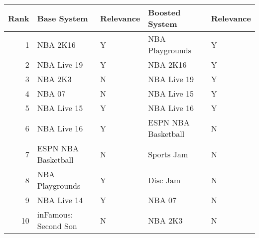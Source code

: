 \begin{tabular}{rllll}
\toprule
Rank & Base System & Relevance & Boosted System & Relevance \\
\midrule
1 & NBA 2K16 & Y & NBA Playgrounds & Y \\
2 & NBA Live 19 & Y & NBA 2K16 & Y \\
3 & NBA 2K3 & N & NBA Live 19 & Y \\
4 & NBA 07 & N & NBA Live 15 & Y \\
5 & NBA Live 15 & Y & NBA Live 16 & Y \\
6 & NBA Live 16 & Y & ESPN NBA Basketball & N \\
7 & ESPN NBA Basketball & N & Sports Jam & N \\
8 & NBA Playgrounds & Y & Disc Jam & N \\
9 & NBA Live 14 & Y & NBA 07 & N \\
10 & inFamous: Second Son & N & NBA 2K3 & N \\
\bottomrule
\end{tabular}
